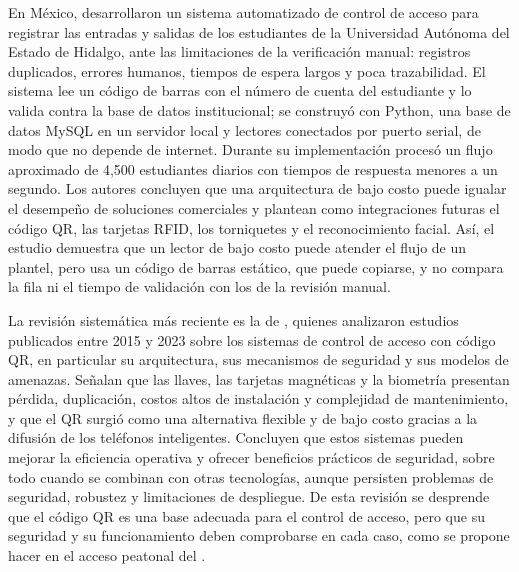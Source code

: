 En México, \textcite{tinajero2026acceso} desarrollaron un sistema automatizado
de control de acceso para registrar las entradas y salidas de los estudiantes
de la Universidad Autónoma del Estado de Hidalgo, ante las limitaciones de la
verificación manual: registros duplicados, errores humanos, tiempos de espera
largos y poca trazabilidad. El sistema lee un código de barras con el número
de cuenta del estudiante y lo valida contra la base de datos institucional;
se construyó con Python, una base de datos MySQL en un servidor local y
lectores conectados por puerto serial, de modo que no depende de internet.
Durante su implementación procesó un flujo aproximado de 4,500 estudiantes
diarios con tiempos de respuesta menores a un segundo. Los autores concluyen
que una arquitectura de bajo costo puede igualar el desempeño de soluciones
comerciales y plantean como integraciones futuras el código QR, las tarjetas
RFID, los torniquetes y el reconocimiento facial. Así, el estudio demuestra
que un lector de bajo costo puede atender el flujo de un plantel, pero usa un
código de barras estático, que puede copiarse, y no compara la fila ni el
tiempo de validación con los de la revisión manual.

La revisión sistemática más reciente es la de \textcite{alsawi2026qracs},
quienes analizaron estudios publicados entre 2015 y 2023 sobre los sistemas de
control de acceso con código QR, en particular su arquitectura, sus mecanismos
de seguridad y sus modelos de amenazas. Señalan que las llaves, las tarjetas
magnéticas y la biometría presentan pérdida, duplicación, costos altos de
instalación y complejidad de mantenimiento, y que el QR surgió como una
alternativa flexible y de bajo costo gracias a la difusión de los teléfonos
inteligentes. Concluyen que estos sistemas pueden mejorar la eficiencia
operativa y ofrecer beneficios prácticos de seguridad, sobre todo cuando se
combinan con otras tecnologías, aunque persisten problemas de seguridad,
robustez y limitaciones de despliegue. De esta revisión se desprende que el
código QR es una base adecuada para el control de acceso, pero que su
seguridad y su funcionamiento deben comprobarse en cada caso, como se propone
hacer en el acceso peatonal del \tescha{}.


